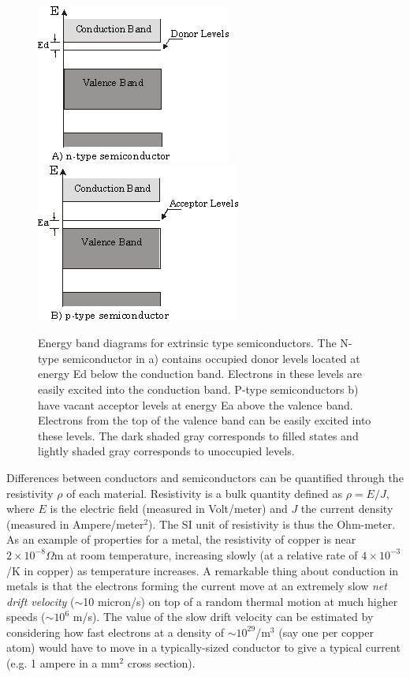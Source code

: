 \documentclass{../lab}
\begin{document}
\begin{figure}[h]
    \centering
    \href{http://experimentationlab.berkeley.edu/sites/default/files/images/SHEimage023.gif}{\includegraphics[width=0.33\linewidth,keepaspectratio]{images/SHEimage023.png}}
    \href{http://experimentationlab.berkeley.edu/sites/default/files/images/SHEimage024.gif}{\includegraphics[width=0.33\linewidth,keepaspectratio]{images/SHEimage024.png}}
    \caption{Energy band diagrams for extrinsic type semiconductors. The N-type semiconductor in a) contains occupied donor levels located at energy Ed below the conduction band. Electrons in these levels are easily excited into the conduction band. P-type semiconductors b) have vacant acceptor levels at energy Ea above the valence band. Electrons from the top of the valence band can be easily excited into these levels. The dark shaded gray corresponds to filled states and lightly shaded gray corresponds to unoccupied levels.}
\end{figure}

Differences between conductors and semiconductors can be quantified through the resistivity $\rho$ of each material. Resistivity is a bulk quantity defined as $\rho = E/J$, where $E$ is the electric field (measured in Volt/meter) and $J$ the current density (measured in Ampere/meter$^2$). The SI unit of resistivity is thus the Ohm-meter. As an example of properties for a metal, the resistivity of copper is near $2 \times 10^{-8} \Omega$m at room temperature, increasing slowly (at a relative rate of $4 \times 10^{-3}$/K in copper) as temperature increases. A remarkable thing about conduction in metals is that the electrons forming the current move at an extremely slow \emph{net drift velocity} ($\sim$10 micron/s) on top of a random thermal motion at much higher speeds ($\sim 10^6$ m/s). The value of the slow drift velocity can be estimated by considering how fast electrons at a density of $\sim 10^{29}$/m$^3$ (say one per copper atom) would have to move in a typically-sized conductor to give a typical current (e.g. 1 ampere in a mm$^{2}$ cross section).
\end{document}
